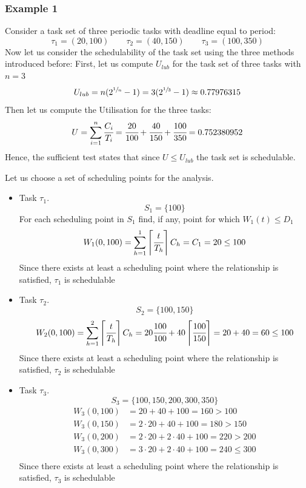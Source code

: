    \subsubsection{Example 1}
    Consider a task set of three periodic tasks with deadline equal to period:
    \[\tau_1 = (20,100)\qquad \tau_2 = (40, 150)\qquad \tau_3 = (100,350)\]
    Now let us consider the schedulability of the task set using the three methods introduced before:
    {
        First, let us compute $U_{lub}$ for the task set of three tasks with $n=3$
        \[U_{lub} = n(2^{\sfrac{1}{n}} - 1) = 3(2^{\sfrac{1}{3}} - 1) \approx 0.77976315\]
        Then let us compute the Utilisation for the three tasks:
        \[U = \sum_{i=1}^n \cfrac{C_i}{T_i} = \cfrac{20}{100} + \cfrac{40}{150} + \cfrac{100}{350} = 0.752380952\]
        Hence, the sufficient test states that since $U \le U_{lub}$ the task set is schedulable.
        }
    {
        Let us choose a set of scheduling points for the analysis.
        \begin{itemize}
            \item Task $\tau_1$.
            \[S_1 = \{100\}\]
            For each scheduling point in $S_1$ find, if any, point for which $W_1(t)\le D_1$
            \begin{align*}
                W_1(0,100) = \sum_{h=1}^1 \left\lceil \cfrac{t}{T_h} \right\rceil C_h = C_1 = 20 \le 100
            \end{align*}
            Since there exists at least a scheduling point where the relationship is satisfied, $\tau_1$ is schedulable
            \item Task $\tau_2$.
            \[S_2 = \{100, 150\}\]
            \begin{align*}
                W_2(0,100) = \sum_{h=1}^2 \left\lceil \cfrac{t}{T_h} \right\rceil C_h = 20\cfrac{100}{100} + 40 \left\lceil \cfrac{100}{150} \right\rceil = 20 + 40 = 60 \le 100
            \end{align*}
            Since there exists at least a scheduling point where the relationship is satisfied, $\tau_2$ is schedulable
            \item Task $\tau_3$.
            \[S_3 = \{100, 150, 200, 300, 350\}\]
            \begin{align*}
                W_3(0,100) &= 20 + 40 + 100 = 160 > 100\\
                W_3(0,150) &= 2\cdot 20 + 40  + 100 = 180 > 150\\
                W_3(0,200) &= 2\cdot 20 + 2\cdot 40 + 100 = 220 > 200 \\
                W_3(0,300) &= 3\cdot 20 + 2 \cdot 40 + 100 = 240 \le 300\\
            \end{align*}
            Since there exists at least a scheduling point where the relationship is satisfied, $\tau_3$ is schedulable
        \end{itemize}
        }

